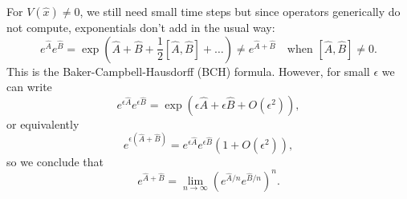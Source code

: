 For $V(\hat x)\neq 0$, we still need small time steps but since operators generically do not compute, exponentials don't add in the usual way:
\begin{equation*}
    e^{\hat A} e^{\hat B} = \exp(\hat A + \hat B + \frac{1}{2}[\hat A, \hat B] + \ldots) \neq e^{\hat A + \hat B}\quad \text{when }[\hat A, \hat B] \neq 0.
\end{equation*}
This is the Baker-Campbell-Hausdorff (BCH) formula. However, for small $\epsilon$ we can write
\begin{equation*}
    e^{\epsilon \hat A} e^{\epsilon \hat B} = \exp(\epsilon \hat A + \epsilon \hat B +O(\epsilon^2)),
\end{equation*}
or equivalently
\begin{equation*}
    e^{\epsilon(\hat A + \hat B)} = e^{\epsilon \hat A} e^{\epsilon \hat B}(1+O(\epsilon^2)),
\end{equation*}
so we conclude that
\begin{equation*}
    e^{\hat A +\hat B}=\lim_{n\to \infty} \left(e^{\hat A/n}e^{\hat B/n}\right)^n.
\end{equation*}

